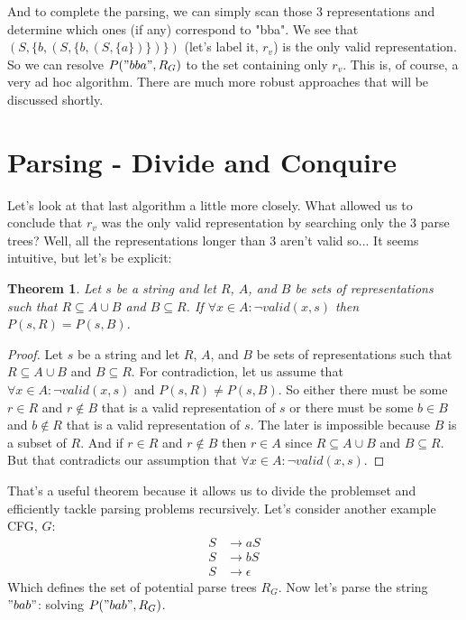 \documentclass[11pt]{article}
\begin{document}
And to complete the parsing, we can simply scan those 3 representations and determine which ones (if any) correspond to "bba".
We see that $(S, \{b, (S, \{b, (S, \{a\})\})\})$ (let's label it, $r_v$) is the only valid representation.
So we can resolve $P("bba", R_G)$ to the set containing only $r_v$.
This is, of course, a very ad hoc algorithm.
There are much more robust approaches that will be discussed shortly.

\section*{Parsing - Divide and Conquire}

Let's look at that last algorithm a little more closely. What allowed us to conclude that $r_v$ was the only valid representation
by searching only the 3 parse trees? Well, all the representations longer than 3 aren't valid so... It seems intuitive, but let's be explicit:

\newtheorem{divconq}{Theorem}
\begin{divconq}
\label{divconq}
Let $s$ be a string and let $R$, $A$, and $B$ be sets of representations such that $R \subseteq A \cup B$ and $B \subseteq R$.
If $\forall x \in A : \lnot valid(x, s)$ then $P(s, R) = P(s, B)$. 
\end{divconq}
\begin{proof}
Let $s$ be a string and let $R$, $A$, and $B$ be sets of representations such that $R \subseteq A \cup B$ and $B \subseteq R$.
For contradiction, let us assume that $\forall x \in A : \lnot valid(x, s)$ and $P(s, R) \neq P(s, B)$.
So either there must be some $r \in R$ and $r \not\in B$ that is a valid representation of $s$ or there must be
some $b \in B$ and $b \not\in R$ that is a valid representation of $s$.
The later is impossible because $B$ is a subset of $R$. 
And if $r \in R$ and $r \not\in B$ then $r \in A$ since $R \subseteq A \cup B$ and $B \subseteq R$.
But that contradicts our assumption that $\forall x \in A : \lnot valid(x,s)$.
\qedhere
\end{proof}

That's a useful theorem because it allows us to divide the problemset and efficiently tackle parsing problems recursively.
Let's consider another example CFG, $G$:
\begin{align*}
S &\rightarrow a S\\
S &\rightarrow b S\\
S &\rightarrow \epsilon
\end{align*}
Which defines the set of potential parse trees $R_G$. Now let's parse the string $"bab"$: solving $P("bab", R_G)$.
\end{document}

